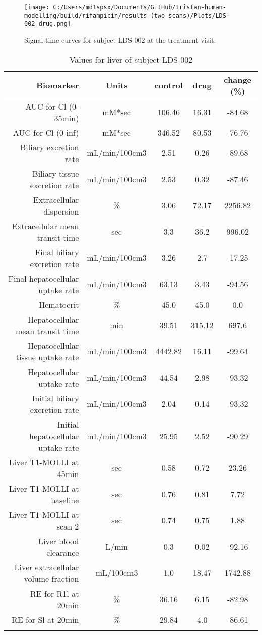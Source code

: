 \documentclass{epflreport}%
\begin{document}
%


\begin{figure}[h!]%
\centering%
\texttt{[image: C:/Users/md1spsx/Documents/GitHub/tristan-human-modelling/build/rifampicin/results (two scans)/Plots/LDS-002\_drug.png]}%
\caption{Signal{-}time curves for subject LDS{-}002 at the treatment visit.}%
\end{figure}

%
\clearpage%
\begin{longtable}{rcccc}%
\hline%
Biomarker&Units&control&drug&change (\%)\\%
\hline%
AUC for Cl (0{-}35min)&mM*sec&106.46&16.31&{-}84.68\\%
AUC for Cl (0{-}inf)&mM*sec&346.52&80.53&{-}76.76\\%
Biliary excretion rate&mL/min/100cm3&2.51&0.26&{-}89.68\\%
Biliary tissue excretion rate&mL/min/100cm3&2.53&0.32&{-}87.46\\%
Extracellular dispersion&\%&3.06&72.17&2256.82\\%
Extracellular mean transit time&sec&3.3&36.2&996.02\\%
Final biliary excretion rate&mL/min/100cm3&3.26&2.7&{-}17.25\\%
Final hepatocellular uptake rate&mL/min/100cm3&63.13&3.43&{-}94.56\\%
Hematocrit&\%&45.0&45.0&0.0\\%
Hepatocellular mean transit time&min&39.51&315.12&697.6\\%
Hepatocellular tissue uptake rate&mL/min/100cm3&4442.82&16.11&{-}99.64\\%
Hepatocellular uptake rate&mL/min/100cm3&44.54&2.98&{-}93.32\\%
Initial biliary excretion rate&mL/min/100cm3&2.04&0.14&{-}93.32\\%
Initial hepatocellular uptake rate&mL/min/100cm3&25.95&2.52&{-}90.29\\%
Liver T1{-}MOLLI at 45min&sec&0.58&0.72&23.26\\%
Liver T1{-}MOLLI at baseline&sec&0.76&0.81&7.72\\%
Liver T1{-}MOLLI at scan 2&sec&0.74&0.75&1.88\\%
Liver blood clearance&L/min&0.3&0.02&{-}92.16\\%
Liver extracellular volume fraction&mL/100cm3&1.0&18.47&1742.88\\%
RE for R1l at 20min&\%&36.16&6.15&{-}82.98\\%
RE for Sl at 20min&\%&29.84&4.0&{-}86.61\\%
\hline%
\caption{Values for liver of subject LDS-002} \\%
\end{longtable}%
\end{document}
